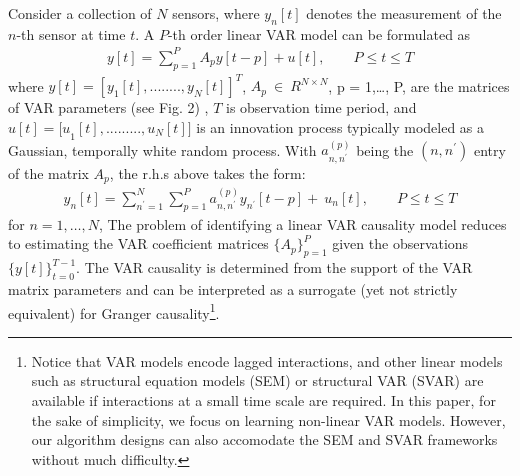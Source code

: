 Consider a collection of $N$ sensors, where $y_n[t]$ denotes the measurement of the $n$-th sensor at time $t$. A $P$-th order linear VAR model can be formulated as 
\begin{align} \label{eq:var_matrix}
      y[t]=\sum_{p=1}^{P} A_p y[t-p]+u[t],  \quad \quad P \leq t \leq T
\end{align}
where $y[t]=[y_1[t],........,y_N[t]]^T$, $A_p\ \in\ R^{N\times N}$, p = 1,\ldots, P, are the matrices of VAR parameters (see Fig. 2) , $T$ is observation time period, and $u[t]={[u}_1[t],.........,u_N[t]]$ is an innovation process typically modeled as a Gaussian, temporally white random process. With $a_{n,n^\prime}^{(p)}$ being the $(n,n^\prime)$ entry of the matrix $A_p$, the r.h.s above takes the form:
 \begin{align} \label{eq:var_scalar}
       y_n[t] = \sum_{n^\prime=1}^{N}\sum_{p=1}^{P}{a_{n,n^\prime}^{(p)}y_{n^\prime}}[t-p]+\ u_n[t], \quad \quad P \leq t \leq T
	\end{align}
for $n = 1,\ldots, N$, %
The problem of identifying a linear VAR causality model reduces to estimating the VAR coefficient matrices $\{A_p\}_{p=1}^P$ given the observations $\{y[t]\}_{t=0}^{T-1}$. The VAR causality \cite{lutkepohl2005} is determined from the support of the VAR matrix parameters and can be interpreted as a surrogate (yet not strictly equivalent) for Granger causality\footnote{Notice that VAR models encode lagged interactions, and other linear models such as structural equation models (SEM) or structural VAR (SVAR) are available if interactions at a small time scale are required. In this paper, for the sake of simplicity, we focus on learning non-linear VAR models. However, our algorithm designs can also accomodate the SEM and SVAR frameworks without much difficulty.}.
\iffalse
\begin{figure}[h]
\centering
\texttt{[image: figures/figvar.png]}
\caption{{ Tensor $A$ collecting the VAR parameter matrices \cite{zaman2020online}.  }}
\label{fig:A_tensor}
\end{figure}
\fi



